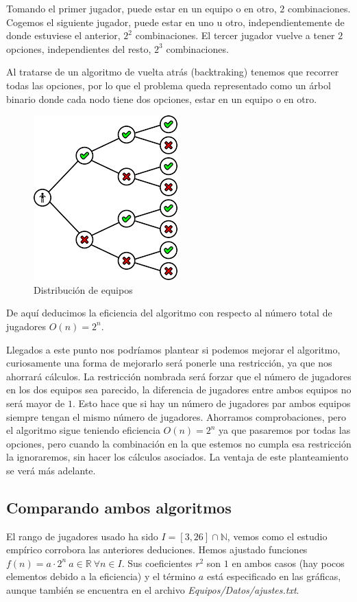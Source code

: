 Tomando el primer jugador, puede estar en un equipo o en otro, $2$ combinaciones. Cogemos el siguiente jugador, puede estar en uno u otro, independientemente de donde estuviese el anterior, $2^2$ combinaciones. El tercer jugador vuelve a tener $2$ opciones, independientes del resto, $2^3$ combinaciones. 

Al tratarse de un algoritmo de vuelta atrás (backtraking) tenemos que recorrer todas las opciones, por lo que el problema queda representado como un árbol binario donde cada nodo tiene dos opciones, estar en un equipo o en otro.

\begin{figure}[H]
    \centering
    \includegraphics[scale=0.75]{./Imagenes/arbolbin.png}
    \caption{Distribución de equipos}
    \label{fig:arbolbin}
\end{figure}

De aquí deducimos la eficiencia del algoritmo con respecto al número total de jugadores $O(n)=2^n$.

Llegados a este punto nos podríamos plantear si podemos mejorar el algoritmo, curiosamente una forma de mejorarlo será ponerle una restricción, ya que nos ahorrará cálculos. 
La restricción nombrada será forzar que el número de jugadores en los dos equipos sea parecido, la diferencia de jugadores entre ambos equipos no será mayor de $1$. 
Esto hace que si hay un número de jugadores par ambos equipos siempre tengan el mismo número de jugadores. 
Ahorramos comprobaciones, pero el algoritmo sigue teniendo eficiencia $O(n)=2^n$ ya que pasaremos por todas las opciones, pero cuando la combinación en la que estemos no cumpla esa restricción la ignoraremos, sin hacer los cálculos asociados. 
La ventaja de este planteamiento se verá más adelante.


\subsection{Comparando ambos algoritmos}
El rango de jugadores usado ha sido $I=[3,26]\cap\mathbb{N}$, vemos como el estudio empírico corrobora las anteriores deduciones. 
Hemos ajustado funciones $f(n)=a \cdot 2^n\ a\in\mathbb{R}	\ \forall n\in I$. Sus coeficientes $r^2$ son $1$ en ambos casos (hay pocos elementos debido a la eficiencia) y el término $a$ está especificado en las gráficas, aunque también se encuentra en el archivo \textit{Equipos/Datos/ajustes.txt}.

